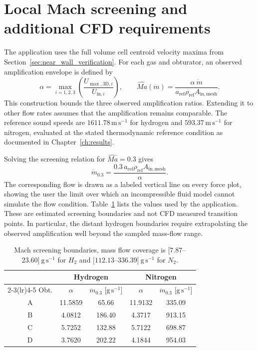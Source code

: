\section{Local Mach screening and additional CFD requirements}
\label{sec:tool_mach_screen}

The application uses the full volume cell centroid velocity maxima from Section~\ref{sec:near_wall_verification}. For each gas and obturator, an observed amplification envelope is defined by
\begin{equation}
\alpha=\max_{i=1,2,3}
\left(\frac{U_{\max,\mathrm{3D},i}}{U_{\mathrm{in},i}}\right),
\qquad
\widehat{Ma}(\dot m)=
\frac{\alpha \ \dot m}{a_{\mathrm{ref}}\rho_{\mathrm{ref}}A_{\mathrm{in,mesh}}}.
\label{eq:tool_mach_envelope}
\end{equation}
This construction bounds the three observed amplification ratios. Extending it to other flow rates assumes that the amplification remains comparable. The reference sound speeds are $1611.78\,\mathrm{m\,s^{-1}}$ for hydrogen and $593.37\,\mathrm{m\,s^{-1}}$ for nitrogen, evaluated at the stated thermodynamic reference condition as documented in Chapter~\ref{ch:results}.

Solving the screening relation for $\widehat{Ma}=0.3$ gives
\begin{equation}
\dot m_{0.3}=\frac{0.3\,a_{\mathrm{ref}}\rho_{\mathrm{ref}}A_{\mathrm{in,mesh}}}{\alpha}.
\label{eq:tool_mach_flow_limit}
\end{equation}
The corresponding flow is drawn as a labeled vertical line on every force plot, showing the user the limit over which an incompressible fluid model cannot simulate the flow condition. Table~\ref{tab:tool_mach_limits} lists the values used by the application. These are estimated screening boundaries and not CFD measured transition points. In particular, the distant hydrogen boundaries require extrapolating the observed amplification well beyond the sampled mass-flow range.

\begin{table}[htbp]
\centering
\begin{tabular}{@{}ccccc@{}}
\toprule
& \multicolumn{2}{c}{Hydrogen} & \multicolumn{2}{c}{Nitrogen}\\
\cmidrule(lr){2-3}\cmidrule(lr){4-5}
Obt. & $\alpha$ & $\dot m_{0.3}$ [$\mathrm{g\,s^{-1}}$] & $\alpha$ & $\dot m_{0.3}$ [$\mathrm{g\,s^{-1}}$]\\
\midrule
A & 11.5859 & 65.66 & 11.9132 & 335.09\\
B & 4.0812 & 186.40 & 4.3717 & 913.15\\
C & 5.7252 & 132.88 & 5.7122 & 698.87\\
D & 3.7620 & 202.22 & 4.1844 & 954.03\\
\bottomrule
\end{tabular}
\caption{Mach screening boundaries, mass flow coverage is $[7.87$--$23.60] \ \mathrm{g\,s^{-1}}$ for $H_2$ and $[112.13$--$336.39] \ \mathrm{g\,s^{-1}}$ for $N_2$.}
\label{tab:tool_mach_limits}
\end{table}

